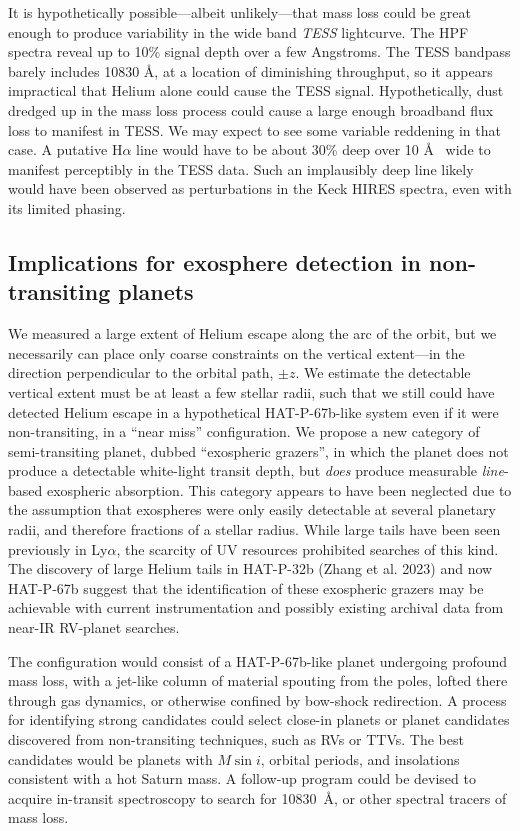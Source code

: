 \documentclass[twocolumn]{aastex631}
\begin{document}
It is hypothetically possible---albeit unlikely---that mass loss could be great enough to produce variability in the wide band \emph{TESS} lightcurve.  The HPF spectra reveal up to 10\% signal depth over a few Angstroms.  The TESS bandpass barely includes 10830 \AA, at a location of diminishing throughput, so it appears impractical that Helium alone could cause the TESS signal.  Hypothetically, dust dredged up in the mass loss process could cause a large enough broadband flux loss to manifest in TESS.  We may expect to see some variable reddening in that case.  A putative H$\alpha$ line would have to be about 30\% deep over 10 \AA~ wide to manifest perceptibly in the TESS data.  Such an implausibly deep line likely would have been observed as perturbations in the Keck HIRES spectra, even with its limited phasing.

\subsection{Implications for exosphere detection in non-transiting planets}

We measured a large extent of Helium escape along the arc of the orbit, but we necessarily can place only coarse constraints on the vertical extent---in the direction perpendicular to the orbital path, $\pm z$.  We estimate the detectable vertical extent must be at least a few stellar radii, such that we still could have detected Helium escape in a hypothetical HAT-P-67b-like system even if it were non-transiting, in a ``near miss'' configuration.  We propose a new category of semi-transiting planet, dubbed ``exospheric grazers'', in which the planet does not produce a detectable white-light transit depth, but \emph{does} produce measurable \emph{line}-based exospheric absorption.  This category appears to have been neglected due to the assumption that exospheres were only easily detectable at several planetary radii, and therefore fractions of a stellar radius.  While large tails have been seen previously in Ly$\alpha$, the scarcity of UV resources prohibited searches of this kind.  The discovery of large Helium tails in HAT-P-32b (Zhang et al. 2023) and now HAT-P-67b suggest that the identification of these exospheric grazers may be achievable with current instrumentation and possibly existing archival data from near-IR RV-planet searches.

The configuration would consist of a HAT-P-67b-like planet undergoing profound mass loss, with a jet-like column of material spouting from the poles, lofted there through gas dynamics, or otherwise confined by bow-shock redirection.  A process for identifying strong candidates could select close-in planets or planet candidates discovered from non-transiting techniques, such as RVs or TTVs.  The best candidates would be planets with $M\sin{i}$, orbital periods, and insolations consistent with a hot Saturn mass.  A follow-up program could be devised to acquire in-transit spectroscopy to search for  10830~\AA, or other spectral tracers of mass loss.
\end{document}
